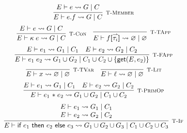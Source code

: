\begin{figure}
    \centering
    \[
        \infer[\textsc{\footnotesize T-Member}]{
            E \vdash e.f
                \rightsquigarrow G\; |\; C
        }{
            E \vdash e \rightsquigarrow G\; |\; C
        }
    \]
    \vspace{10pt}
    \[
        \infer[\textsc{\footnotesize T-Con}]{
            E \vdash \kappa\; e
                \rightsquigarrow G\; |\; C
        }{
            E \vdash e \rightsquigarrow G\; |\; C
        }
        \hspace{1em}
        \infer[\textsc{\footnotesize T-TApp}]{
            E \vdash f\textbf{[}\harpoon{\tau_i}\textbf{]}
                \rightsquigarrow \varnothing\; |\; \varnothing
        }{
        }
    \]
    \vspace{10pt}
    \[
        \infer[\textsc{\footnotesize T-FApp}]{
            E \vdash e_1\; e_2
                \rightsquigarrow G_1 \cup G_2\; |\; C_1 \cup C_2 
                \cup \{\textsf{get}(E,e_2)\}
        }{
            E \vdash e_1 \rightsquigarrow G_1\; |\; C_1
            \hspace{1em}
            E \vdash e_2 \rightsquigarrow G_2\; |\; C_2
        }
    \]
    \vspace{10pt}
    \[
        \infer[\textsc{\footnotesize T-TVar}]{
            E \vdash x
                \rightsquigarrow \varnothing\; |\; \varnothing
        }{}
        \hspace{1em}
        \infer[\textsc{\footnotesize T-Lit}]{
            E \vdash \ell
                \rightsquigarrow \varnothing\; |\; \varnothing
        }{}
    \]
    \vspace{10pt}
    \[
        \infer[\textsc{\footnotesize T-PrimOp}]{
            E \vdash e_1 \text{ \textasteriskcentered }\; e_2
                \rightsquigarrow G_1 \cup G_2\; |\; C_1 \cup C_2
        }{
            E \vdash e_1 \rightsquigarrow G_1\; |\; C_1
            \hspace{1em}
            E \vdash e_2 \rightsquigarrow G_2\; |\; C_2
        }
    \]
    \vspace{10pt}
    \[
        \infer[\textsc{\footnotesize T-If}]{
            E \vdash \textsf{if } e_1 \textsf{ then } e_2 \textsf{ else } e_3
                \rightsquigarrow G_1 \cup G_2 \cup G_3\; |\; C_1 \cup C_2 \cup C_3
        }{
            \begin{array}{c}
                E \vdash e_1 \rightsquigarrow G_1\; |\; C_1 \\
                E \vdash e_2 \rightsquigarrow G_2\; |\; C_2

\end{array}}\]
\end{figure}
